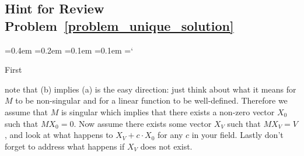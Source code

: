 
\subsection*{Hint for Review Problem~\ref{problem_unique_solution}}

{\ttfamily
{}\font=0.4em
\font=0.2em
\font=0.1em
\font=0.1em
\hyphenchar\font=`\-


\hypertarget{scripts_inverse_matrix_unique_soln}{First}note  that (b) implies (a) is the easy direction: just think about what it means for $M$ to be non-singular and for a linear function to be well-defined. Therefore we assume that $M$ is singular which implies that there exists a non-zero vector $X_0$ such that $MX_0 = 0$. Now assume there exists some vector $X_V$ such that $M X_V = V$, and look at what happens to $X_V + c \cdot X_0$ for any $c$ in your field. Lastly don't forget to address what happens if $X_V$ does not exist.

} %


